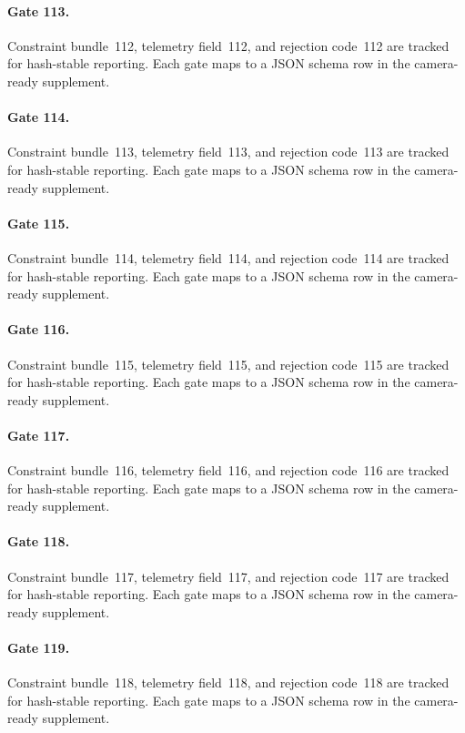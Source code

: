 \documentclass[sigconf,nonacm]{acmart}
\begin{document}
\paragraph{Gate 113.}
Constraint bundle~112, telemetry field~112, and rejection code~112 are tracked for hash-stable reporting. Each gate maps to a JSON schema row in the camera-ready supplement. %

\paragraph{Gate 114.}
Constraint bundle~113, telemetry field~113, and rejection code~113 are tracked for hash-stable reporting. Each gate maps to a JSON schema row in the camera-ready supplement. %

\paragraph{Gate 115.}
Constraint bundle~114, telemetry field~114, and rejection code~114 are tracked for hash-stable reporting. Each gate maps to a JSON schema row in the camera-ready supplement. %

\paragraph{Gate 116.}
Constraint bundle~115, telemetry field~115, and rejection code~115 are tracked for hash-stable reporting. Each gate maps to a JSON schema row in the camera-ready supplement. %

\paragraph{Gate 117.}
Constraint bundle~116, telemetry field~116, and rejection code~116 are tracked for hash-stable reporting. Each gate maps to a JSON schema row in the camera-ready supplement. %

\paragraph{Gate 118.}
Constraint bundle~117, telemetry field~117, and rejection code~117 are tracked for hash-stable reporting. Each gate maps to a JSON schema row in the camera-ready supplement. %

\paragraph{Gate 119.}
Constraint bundle~118, telemetry field~118, and rejection code~118 are tracked for hash-stable reporting. Each gate maps to a JSON schema row in the camera-ready supplement. %
\end{document}
